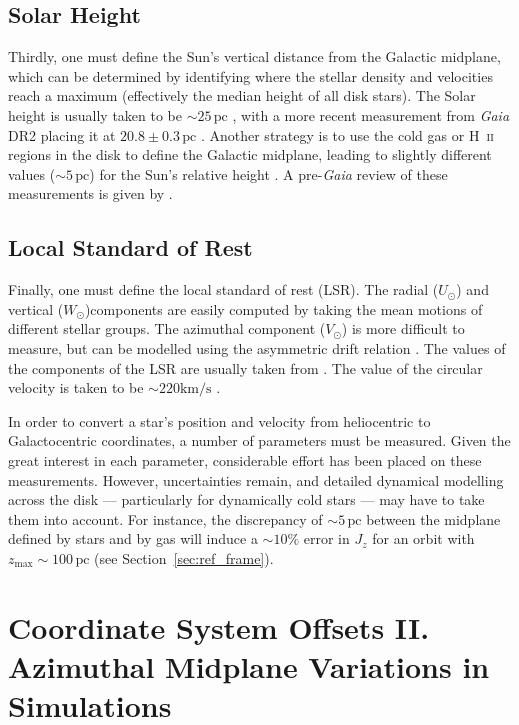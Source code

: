 \documentclass[twocolumn]{aastex62}
\newcommand{\pc}{\text{pc}}
\newcommand{\kms}{\text{km}/\text{s}}
\begin{document}
\subsection{Solar Height}
Thirdly, one must define the Sun's vertical distance from the Galactic
midplane, which can be determined by identifying where the stellar density
and velocities reach a maximum (effectively the median height of all disk
stars). The Solar height is usually taken to be $\sim 25\,\pc$
\citep{2001ApJ...553..184C}, with a more recent measurement from {\em Gaia} DR2
placing it at $20.8 \pm 0.3\,\pc$ \citep{2019MNRAS.482.1417B}. Another strategy is
to use the cold gas or H~\textsc{ii} regions in the disk to define the Galactic
midplane, leading to slightly different values ($\sim 5\,\pc$) for the Sun's
relative height \citep[e.g.][]{2019ApJ...871..145A}. A pre-{\em Gaia} review
of these measurements is given by \citet{2016ARAA..54..529B}.

\subsection{Local Standard of Rest}
Finally, one must define the local standard of rest (LSR). The radial
($U_{\odot}$) and vertical ($W_{\odot}$)components are easily computed by
taking the mean motions of different stellar groups. The azimuthal component
($V_{\odot}$) is more difficult to measure, but can be modelled using the
asymmetric drift relation \citep{2008gady.book.....B}. The values of the
components of the LSR are usually taken from \citet{2010MNRAS.403.1829S}. The
value of the circular velocity is taken to be $\sim 220\kms$
\citep[e.g.][]{2012ApJ...759..131B}.

In order to convert a star's position and velocity from heliocentric to
Galactocentric coordinates, a number of parameters must be measured. Given the
great interest in each parameter, considerable effort has been placed on these
measurements. However, uncertainties remain, and detailed dynamical modelling
across the disk --- particularly for dynamically cold stars --- may have to
take them into account. For instance, the discrepancy of $\sim 5\,\pc$ between
the midplane defined by stars and by gas will induce a $\sim10\%$ error in
$J_z$ for an orbit with $z_{\text{max}}\sim100\,\pc$ (see
Section~\ref{sec:ref_frame}).

\section{Coordinate System Offsets II. Azimuthal Midplane Variations in
Simulations}
\label{sec:local_fire}
\end{document}
